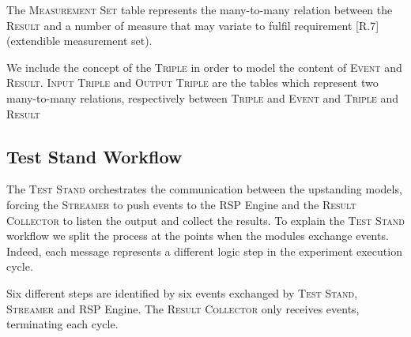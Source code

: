 The \textsc{Measurement Set} table represents the many-to-many relation between the \textsc{Result} and a number of measure that may variate  to fulfil requirement [R.7] (extendible measurement set). 

We include the concept of the \textsc{Triple} in order to model the content of \textsc{Event} and \textsc{Result}. \textsc{Input Triple} and \textsc{Output Triple} are the tables which represent two many-to-many relations, respectively between \textsc{Triple} and \textsc{Event} and \textsc{Triple}  and \textsc{Result}

\subsection{Test Stand Workflow}\label{sec:test-stand-workflow}

\noindent The \textsc{Test Stand} orchestrates the communication between the upstanding models, forcing the \textsc{Streamer} to push events to the RSP Engine and the \textsc{Result Collector} to listen the output and collect the results. To explain the \textsc{Test Stand} workflow we split the process at the points when the modules exchange events. Indeed, each message represents a different logic step in the experiment execution cycle.

Six different steps are identified by six events exchanged by \textsc{Test Stand}, \textsc{Streamer} and RSP Engine. The \textsc{Result Collector} only receives events, terminating each cycle.


